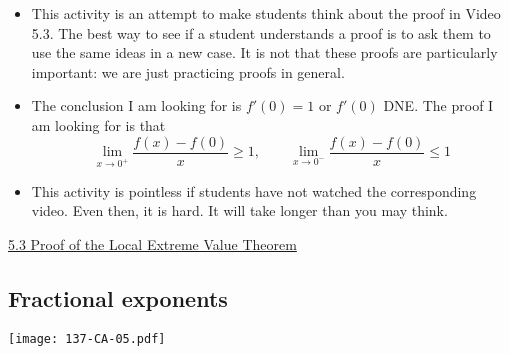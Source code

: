 \documentclass[11pt]{article}
\newcommand {\DS} [1] {${\displaystyle #1}$}
\newcommand{\nl}{\hfill \vspace{-1.1\baselineskip}} %
\newcommand{\viii}{\hspace{8mm} \href{https://www.youtube.com/watch?v=SWb2T0ad6lw&list=PLlwePzQY_wW9m5oabUf6hvfVfAaA9uAwM&index=3}{5.3 Proof of the Local Extreme Value Theorem}}
\begin{document}
\begin{comments}
\nl
\begin{itemize}
\item This activity is an attempt to make students think about the proof in Video 5.3.  The best way to see if a student understands a proof is to ask them to use the same ideas in a new case.  It is not that these proofs are particularly important: we are just practicing proofs in general.

\item The conclusion I am looking for is \DS{f'(0)=1} or \DS{f'(0)} DNE.  The proof I am looking for is that 
	$$
		\lim_{x \to 0^+} \frac{f(x) - f(0)}{x} \geq 1, \quad \quad \lim_{x \to 0^-} \frac{f(x) - f(0)}{x} \leq 1
	$$

\item This activity is pointless if students have not watched the corresponding video.  Even then, it is hard.  It will take longer than you may think.
\end{itemize}	
\end{comments}

\begin{videos}
\viii
\end{videos}

\newpage
\subsection{Fractional exponents}

\begin{center}
{ \texttt{[image: 137-CA-05.pdf]}} 
\end{center}

\vspace{-1cm}
\end{document}
